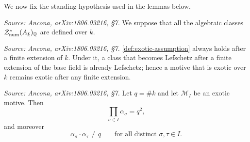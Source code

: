 We now fix the standing hypothesis used in the lemmas below.

\begin{definition}
  \label{def:exotic-assumption}
  \textit{Source: Ancona, arXiv:1806.03216, §7.}
  We suppose that all the algebraic classes
  \(\mathcal{Z}^*_{\mathrm{num}}(A_{\bar k})_{\mathbb{Q}}\) are defined over \(k\).
\end{definition}

\begin{remark}
  \label{rem:exotic-assumption-lef}
  \textit{Source: Ancona, arXiv:1806.03216, §7.}
  \cref{def:exotic-assumption} always holds after a finite extension of \(k\).
  Under it, a class that becomes Lefschetz after a finite extension of the base
  field is already Lefschetz; hence a motive that is exotic over \(k\) remains
  exotic after any finite extension.
\end{remark}

\begin{lemma}
  \label{lem:exotic-frobenius}
  \textit{Source: Ancona, arXiv:1806.03216, §7.}
  Let \(q = \#k\) and let \(\mathcal{M}_I\) be an exotic motive. Then
  \[\prod_{\sigma \in I} \alpha_\sigma = q^2,\]
  and moreover
  \[\alpha_\sigma \cdot \alpha_\tau \neq q
    \qquad \text{for all distinct } \sigma, \tau \in I.\]
\end{lemma}

